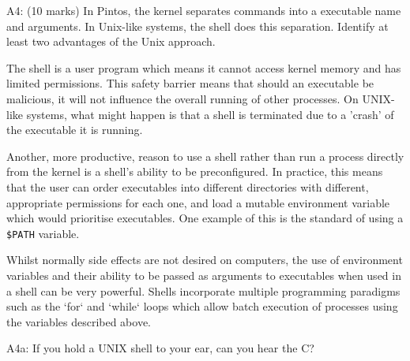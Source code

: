 \noindent A4: (10 marks)
In Pintos, the kernel separates commands into a executable name
and arguments.  In Unix-like systems, the shell does this
separation.  Identify at least two advantages of the Unix approach.

The shell is a user program which means it cannot access kernel memory and has limited permissions. This safety barrier means that should an executable be malicious, it will not influence the overall running of other processes. On UNIX-like systems, what might happen is that a shell is terminated due to a 'crash' of the executable it is running.

Another, more productive, reason to use a shell rather than run a process directly from the kernel is a shell's ability to be preconfigured. In practice, this means that the user can order executables into different directories with different, appropriate permissions for each one, and load a mutable environment variable which would prioritise executables. One example of this is the standard of using a \texttt{\$PATH} variable.

Whilst normally side effects are not desired on computers, the use of environment variables and their ability to be passed as arguments to executables when used in a shell can be very powerful. Shells incorporate multiple programming paradigms such as the `for` and `while` loops which allow batch execution of processes using the variables described above.

\noindent A4a: If you hold a UNIX shell to your ear, can you hear the C?



